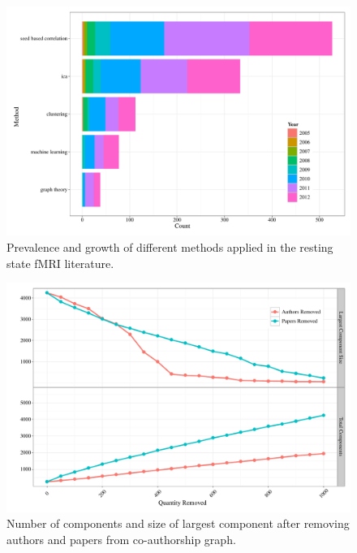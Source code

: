 \documentclass[5p]{elsarticle}
\begin{document}
\begin{figure}
  \begin{center}
    \includegraphics[width=\linewidth]{figures/methods_growth_hist}%
    \caption{Prevalence and growth of different methods applied in the resting
    state fMRI literature. 
        \label{fig:methods_growth_hist}
    }
  \end{center}
\end{figure}

\begin{figure}
  \begin{center}
    \includegraphics[width=\linewidth]{figures/connected_after_removing}%
    \caption{Number of components and size of largest component after removing authors and papers from co-authorship graph.
        \label{fig:connected_after_removing}
    }
  \end{center}
\end{figure}
\end{document}
